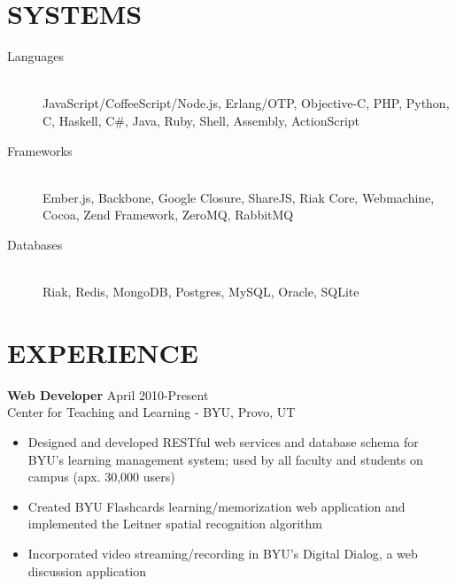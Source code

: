 \documentclass[margin]{res}
\begin{document}
 


  \address{\bf  377 N 750 E\\Provo, UT 84606\\(801) 803-8577}
  \address{bytheway.cameron@gmail.com\\LinkedIn: Cameron Bytheway\\Github: CamShaft}

  \begin{resume}

    \section{SYSTEMS}
      \begin{description}
        \item[Languages] \hfill \\
        JavaScript/CoffeeScript/Node.js, Erlang/OTP, Objective-C, PHP, Python, 
        C, Haskell, C\#, Java, Ruby, Shell, Assembly, ActionScript
        \item[Frameworks] \hfill \\
        Ember.js, Backbone, Google Closure, ShareJS, Riak Core, Webmachine, 
        Cocoa, Zend Framework, ZeroMQ, RabbitMQ
        \item[Databases] \hfill \\
        Riak, Redis, MongoDB, Postgres, MySQL, Oracle, SQLite
      \end{description}

    \section{EXPERIENCE}
      {\bf Web Developer} \hfill April 2010-Present \\
      Center for Teaching and Learning - BYU, Provo, UT
      \begin{itemize} \itemsep -2pt
        \item Designed and developed RESTful web services and database
         schema for BYU's learning management system; used by all 
         faculty and students on campus (apx. 30,000 users)
        \item Created BYU Flashcards learning/memorization web 
        application and implemented the Leitner spatial recognition 
        algorithm
        \item Incorporated video streaming/recording in BYU's Digital 
        Dialog, a web discussion application
      \end{itemize}


\end{resume}
\end{document}
